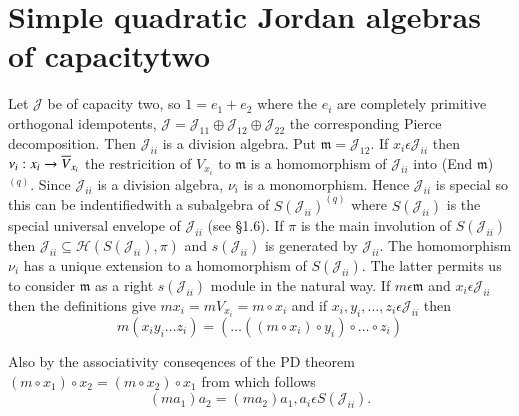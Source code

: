 \section[Simple quadratic Jordan algebras of capacity two]{Simple
  quadratic Jordan algebras of capacity\hfil\break two}\label{c3:sec9} 

Let $\mathscr{J}$ be of capacity two, so $1=e_1+e_2$ where the $e_i$
are completely primitive orthogonal idempotents,
$\mathscr{J}=\mathscr{J}_{11}\oplus
\mathscr{J}_{12}\oplus\mathscr{J}_{22}$ the corresponding Pierce
decomposition. Then $\mathscr{J}_{ii}$ is a division algebra. Put
$\mathfrak{m}=\mathscr{J}_{12}$. If  $x_i\epsilon \mathscr{J}_{ii}$
then $\nu_i:x_i\to \overline{V}_{x_{i}}$ the restricition of $V_{x_i}$ to
$\mathfrak{m}$ is a homomorphism of $\mathscr{J}_{ii}$ into (End
$\mathfrak{m}$)$^{(q)}$. Since $\mathscr{J}_{ii}$ is a division
algebra, $\nu_i$ is a monomorphism. Hence $\mathscr{J}_{ii}$ is
special so this can be indentified\pageoriginale with a subalgebra of
$S(\mathscr{J}_{ii})^{(q)}$ where $S(\mathscr{J}_{ii})$ is the special
universal envelope of $\mathscr{J}_{ii}$ (see \S 1.6). If $\pi$ is the
main involution of $S(\mathscr{J}_{ii})$ then
$\mathscr{J}_{ii}\subseteq \mathscr{H}(S(\mathscr{J}_{ii}),\pi)$ and
$s(\mathscr{J}_{ii})$ is generated by $\mathscr{J}_{ii}$. The
homomorphism $\nu_i$ has a unique extension to a homomorphism of
$S(\mathscr{J}_{ii})$. The latter permits us to consider $\mathfrak{m}$
as a right $s(\mathscr{J}_{ii})$ module in the natural way. If
$m\epsilon \mathfrak{m}$ and $x_i\epsilon \mathscr{J}_{ii}$ then the
definitions give $mx_i=mV_{x_i}=m\circ x_i$ and if
$x_i,y_i,\ldots,z_i\epsilon \mathscr{J}_{ii}$ then
\begin{equation*}
  m(x_iy_i\ldots z_i)=(\ldots((m\circ x_i)\circ y_i)\circ\ldots\circ
  z_i)\tag{20}\label{c3:eq20} 
\end{equation*}

Also by the associativity conseqences of the PD theorem $(m\circ
x_1)\circ x_2=(m\circ x_2)\circ x_1$ from which follows
\begin{equation*}
  (ma_1)a_2=(ma_2)a_1,a_i\epsilon
  S(\mathscr{J}_{ii})\tag{21}.\label{c3:eq21} 
\end{equation*}


